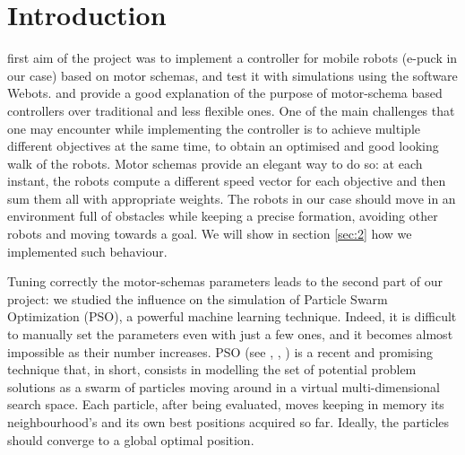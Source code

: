 \documentclass[journal]{IEEEtran}
\begin{document}
\section{Introduction}
\label {sec:1}
% 
% 
% 
% 
 first aim of the project was to implement a controller
for mobile robots (e-puck in our case) based on motor schemas, and test it with simulations
using the software
Webots\textregistered. \cite{IEEEhowto:arkin_motor_schemas} and 
\cite{IEEEhowto:balch_behaviour_based} provide a
good explanation of the purpose of motor-schema based
controllers over traditional and less flexible ones. One of the main challenges that one may encounter while implementing the controller
is to achieve multiple different objectives at the same time,
to obtain an optimised and good looking walk of the robots. 
Motor schemas provide an elegant way to do so: at each instant, the
robots compute a different speed vector for each objective and then
sum them all with appropriate weights. 
The robots in our case should move in an environment full of obstacles while
keeping a precise formation, avoiding other robots and moving towards
a goal. We will show in section \ref{sec:2} how we implemented such behaviour.

Tuning correctly the motor-schemas parameters leads to the second part of our project:
we studied the influence on the simulation of Particle Swarm Optimization (PSO), a
powerful machine learning technique. Indeed, it is difficult to manually set the parameters even with just a few ones, and it becomes almost impossible as their
number increases. PSO (see \cite{IEEEhowto:martinoli_pso},
\cite{IEEEhowto:martinoli_pso_noise}, \cite{IEEEhowto:martinoli_pso_noise_2}) is a recent and promising technique that, in short, consists in modelling the set of potential problem solutions as a swarm of particles moving around in a virtual multi-dimensional
search space. 
Each particle, after being evaluated, moves keeping in memory its neighbourhood's and its own best positions acquired so far. Ideally, the particles should converge to a global optimal position. 
\end{document}

